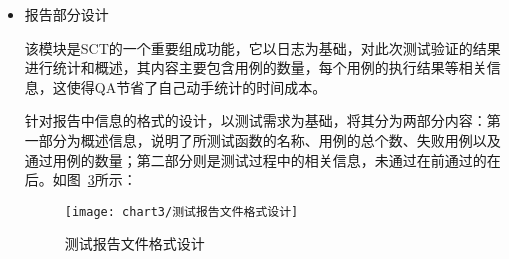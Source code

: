 \begin{itemize}
\begin{itemize}
						\begin{figure}[H] %
							\centering
							\texttt{[image: chart3/日志文件设计图]}
							\caption{日志文件设计图}
							\label{fig:日志文件设计图}
						\end{figure}
						
						为了实现测试日志这一功能，SCT利用支持文件对其进行设计与实现。为了向SCT提供需要测试的功能，本文将测试日志部分设计成为驱动，在SCT启动并且初始化时，首先将该驱动加载到工具中。和面向对象设计中的类相似，本文将自动化测试工具中实现测试功能的部分设计为Protocol，由数据成员和相应的功能函数所构成，其名称为TLL（Test Logging Library）。TLL由构造函数TLLBeginLogging、析构函数TLLEndLogging和其他一些功能函数共同组成。TLLBeginLogging的主要功能为：加载所需被运行测试用例的相关内容，为测试日志的生成在操作系统中提前分配好所需的空间内存，创建好所需的相关结构体，并且打开日志文件对其测试执行过程中的相关信息进行记录。TLLEndLogging的主要功能为：关闭打开的日志文件，释放之前分配的内存空间。我们还设计了一个函数命名为TLLSetConfig，用于在自动化测试工具启动时对其日志模块进行设置。在设计好的日志功能中，还有一个最为重要的函数TLLWriteLogFile，他的主要功能是将测试过程中的日志信息写入到相关的日志文件中。综上所述，日志功能的设计如图~\ref{fig:日志功能的设计表}所示：
						
						\begin{figure}[H] %
							\centering
							\texttt{[image: chart3/日志功能的设计表]}
							\caption{日志功能的设计表}
							\label{fig:日志功能的设计表}
						\end{figure}	
					
					\item 报告部分设计
					
						该模块是SCT的一个重要组成功能，它以日志为基础，对此次测试验证的结果进行统计和概述，其内容主要包含用例的数量，每个用例的执行结果等相关信息，这使得QA节省了自己动手统计的时间成本。
						
						针对报告中信息的格式的设计，以测试需求为基础，将其分为两部分内容：第一部分为概述信息，说明了所测试函数的名称、用例的总个数、失败用例以及通过用例的数量；第二部分则是测试过程中的相关信息，未通过在前通过的在后。如图~\ref{fig:测试报告文件格式设计}所示：
						
						\begin{figure}[H] %
							\centering
							\texttt{[image: chart3/测试报告文件格式设计]}
							\caption{测试报告文件格式设计}
							\label{fig:测试报告文件格式设计}
						\end{figure}	
						

\end{itemize}
\end{itemize}

